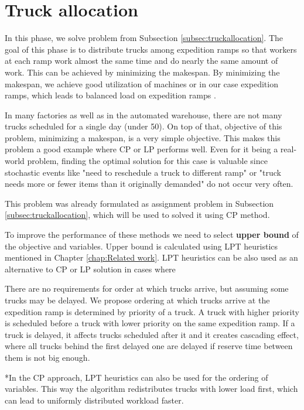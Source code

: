\documentclass{ctuthesis}
\begin{document}
\section{Truck allocation}

In this phase, we solve problem from Subsection \ref{subsec:truckallocation}. The goal of this phase is to distribute trucks among expedition ramps so that workers at each ramp work almost the same time and do nearly the same amount of work. This can be achieved by minimizing the makespan. By minimizing the makespan, we achieve good utilization of machines or in our case expedition ramps, which leads to balanced load on expedition ramps \cite{pinedo}. 

In many factories as well as in the automated warehouse, there are not many trucks scheduled for a single day (under 50). On top of that,  objective of this problem, minimizing a makespan, is a very simple objective. This makes this problem a good example where CP or LP performs well. Even for it being a real-world problem, finding the optimal solution for this case is valuable since stochastic events like "need to reschedule a truck to different ramp" or "truck needs more or fewer items than it originally demanded" do not occur very often.

This problem was already formulated as assignment problem in Subsection \ref{subsec:truckallocation}, which will be used to solved it using CP method.

To improve the performance of these methods we need to select \textbf{upper bound} of the objective and variables. Upper bound is calculated using LPT heuristics mentioned in Chapter \ref{chap:Related work}. LPT heuristics can be also used as an alternative to CP or LP solution in cases where 

There are no requirements for order at which trucks arrive, but assuming some trucks may be delayed. We propose ordering at which trucks arrive at the expedition ramp is determined by priority of a truck. A truck with higher priority is scheduled before a truck with lower priority on the same expedition ramp. If a truck is delayed, it affects trucks scheduled after it and it creates cascading effect, where all trucks behind the first delayed one are delayed if reserve time between them is not big enough. 


*In the CP approach, LPT heuristics can also be used for the ordering of variables. This way the algorithm redistributes trucks with lower load first, which can lead to uniformly distributed workload faster.
\end{document}
